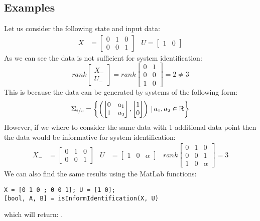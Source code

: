 \subsection{Examples}
Let us consider the following state and input data:
\begin{align*}
	X &= \begin{bmatrix} 0&1&0 \\ 0&0&1 \end{bmatrix} & U = \begin{bmatrix}	1&0	\end{bmatrix}
\end{align*} 
As we can see the data is not sufficient for system identification:
\begin{equation*}
	rank \begin{bmatrix} X_{-} \\ U_{-} \end{bmatrix}  = rank \begin{bmatrix} 0&1 \\ 0&0 \\ 1&0 \end{bmatrix} = 2 \neq 3
\end{equation*}
This is because the data can be generated by systems of the following form:
\[ \Sigma_{i/s} = \left\{ \left( \begin{bmatrix} 0&a_1 \\ 1&a_2 \end{bmatrix}, \begin{bmatrix} 1 \\ 0 \end{bmatrix} \right) \, | \, a_1, a_2 \in \mathbb{R} \right\} \]
However, if we where to consider the same data with 1 additional data point then the data would be informative for system identification:
\begin{align*}
	X_- &= \begin{bmatrix} 0&1&0 \\ 0&0&1 \end{bmatrix} & U &= \begin{bmatrix}	1&0&\alpha	\end{bmatrix} & rank \begin{bmatrix} 0&1&0 \\ 0&0&1 \\ 1&0&\alpha \end{bmatrix} = 3
\end{align*} 
We can also find the same results using the MatLab functions:
\begin{lstlisting}
X = [0 1 0 ; 0 0 1]; U = [1 0];
[bool, A, B] = isInformIdentification(X, U)
\end{lstlisting}
which will return: \mon{[ false, [], [] ]}.





